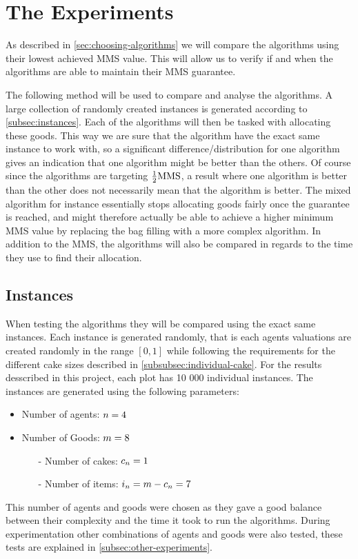 \section{The Experiments}\label{sec:the-experiments}


As described in \autoref{sec:choosing-algorithms} we will compare the algorithms using their lowest achieved MMS value. This will allow us to verify if and when the algorithms are able to maintain their MMS guarantee.

The following method will be used to compare and analyse the algorithms. A large collection of randomly created instances is generated according to \autoref{subsec:instances}. Each of the algorithms will then be tasked with allocating these goods. This way we are sure that the algorithm have the exact same instance to work with, so a significant difference/distribution for one algorithm gives an indication that one algorithm might be better than the others. Of course since the algorithms are targeting $\frac{1}{2}\text{MMS}$, a result where one algorithm is better than the other does not necessarily mean that the algorithm is better. The mixed algorithm for instance essentially stops allocating goods fairly once the guarantee is reached, and might therefore actually be able to achieve a higher minimum MMS value by replacing the bag filling with a more complex algorithm. In addition to the MMS, the algorithms will also be compared in regards to the time they use to find their allocation.


\subsection{Instances}\label{subsec:instances}
When testing the algorithms they will be compared using the exact same instances. Each instance is generated randomly, that is each agents valuations are created randomly in the range $[0,1]$ while following the requirements for the different cake sizes described in \autoref{subsubsec:individual-cake}. For the results desscribed in this project, each plot has 10 000 individual instances. The instances are generated using the following parameters:
\begin{itemize}
    \item Number of agents: $n=4$
    \item Number of Goods: $m=8$
          \begin{itemize}
              \item[-] Number of cakes: $c_n=1$
              \item[-] Number of items: $i_n=m-c_n=7$
          \end{itemize}
\end{itemize}
This number of agents and goods were chosen as they gave a good balance between their complexity and the time it took to run the algorithms. During experimentation other combinations of agents and goods were also tested, these tests are explained in \autoref{subsec:other-experiments}.